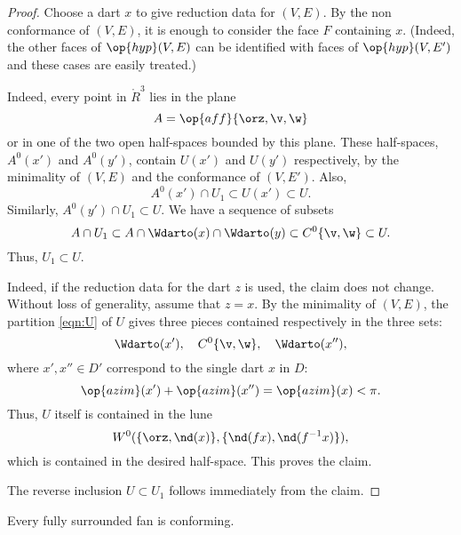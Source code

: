 \begin{proof}
  Choose a dart $x$ to give reduction data for $(V,E)$.  By the non
  conformance of $(V,E)$, it is enough to consider the face $F$
  containing $x$.  (Indeed, the other faces of $\op{hyp}(V,E)$ can be
  identified with faces of $\op{hyp}(V,E')$ and these cases are easily
  treated.)  

    Indeed, every point in
  $\ring{R}^3$ lies in the plane
\[ 
A=\op{aff}\{\orz,\v,\w\}
\] 
or in one of the two open half-spaces bounded by this plane.  These
half-spaces, $A^0(x')$ and $A^0(y')$, contain $U(x')$ and $U(y')$
respectively, by the minimality of $(V,E)$ and the conformance of $(V,E')$.  Also,
\[ 
A^0(x')\cap U_1 \subset U(x')\subset U.
\] 
Similarly, $A^0(y')\cap U_1 \subset U$.  We have a sequence of subsets
\[ 
A \cap U_1 \subset A \cap \Wdarto(x) \cap \Wdarto(y) \subset C^0\{\v,\w\} \subset U.
\] 
Thus,
$U_1\subset U$.

 Indeed,
if the reduction data for the dart $z$ is used, the claim does not change.
Without loss of generality, assume that $z=x$.  By the minimality of $(V,E)$, the
partition \eqref{eqn:U} of $U$ gives three pieces contained respectively
in the three sets:
\[ 
\Wdarto(x'),\quad C^0\{\v,\w\},\quad \Wdarto(x''),
\] 
where $x',x''\in D'$ correspond to the single dart $x$ in $D$:
\[ 
\op{azim}(x') + \op{azim}(x'') = \op{azim}(x) < \pi.
\] 
Thus, $U$ itself is contained in the lune
\[ 
W^0(\{\orz,\nd(x)\},\{\nd(f x),\nd(f^{-1} x)\}),
\] 
which is contained in the desired half-space.  This proves the claim.

The reverse inclusion $U\subset U_1$ follows immediately from the claim.
\end{proof}

%


\begin{lemma}[conformance]\label{lemma:face}
Every fully surrounded fan is conforming.
\end{lemma}

